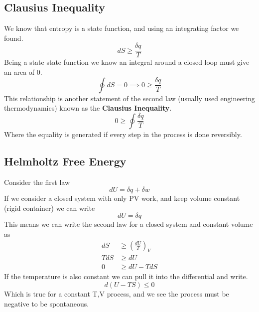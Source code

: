 \documentclass{article}
\begin{document}
\subsection*{Clausius Inequality}
We know that entropy is a state function, and using an integrating factor we found. 
\begin{equation}
    dS \geq \frac{\delta q}{T}
\end{equation}
Being a state state function we know an integral around a closed loop must give an area of 0.
\begin{equation}
    \oint dS = 0 \implies 0 \geq \frac{\delta q}{T}
\end{equation}
This relationship is  another statement of the second law (usually used engineering thermodynamics) known as the \textbf{Clausius Inequality}. 
\begin{equation}
    0 \geq \oint \frac{\delta q}{T}
\end{equation}
Where the equality is generated if every step in the process is done reversibly. 

\subsection*{Helmholtz Free Energy}
Consider the first law
\begin{equation}
    dU = \delta q + \delta w
\end{equation}
If we consider a closed system with only PV work, and keep volume constant (rigid container) we can write
\begin{equation}
    dU = \delta q
\end{equation}
This means we can write the second law for a closed system and constant volume as
\begin{equation}
\begin{split}
    dS &\geq \left(\frac{dU}{T}\right)_V\\
    TdS &\geq dU \\
    0 &\geq dU - TdS
    \end{split}
\end{equation}
If the temperature is also constant we can pull it into the differential and write. 
\begin{equation}
d(U-TS) \leq 0
\end{equation}
Which is true for a constant T,V process, and we see the process must be negative to be spontaneous. 
\end{document}
